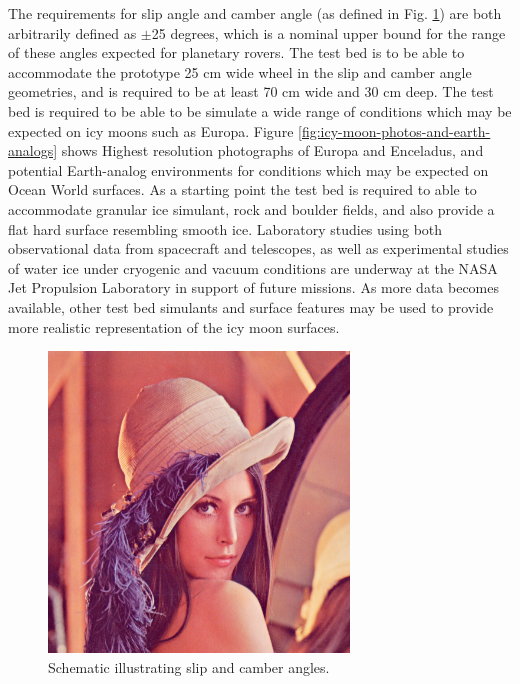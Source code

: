 \documentclass{article}
\begin{document}
The requirements for slip angle and camber angle (as defined in Fig. \ref{fig:slip-camber-schmatic}) are both arbitrarily defined as $\pm$25 degrees, which is a nominal upper bound for the range of these angles expected for planetary rovers. The test bed is to be able to accommodate the prototype 25 cm wide wheel in the slip and camber angle geometries, and is required to be at least 70 cm wide and 30 cm deep. The test bed is required to be able to be simulate a wide range of conditions which may be expected on icy moons such as Europa. Figure \ref{fig:icy-moon-photos-and-earth-analogs} shows Highest resolution photographs of Europa and Enceladus, and potential Earth-analog environments for conditions which may be expected on Ocean World surfaces. As a starting point the test bed is required to able to accommodate granular ice simulant, rock and boulder fields, and also provide a flat hard surface resembling smooth ice. Laboratory studies using both observational data from spacecraft and telescopes, as well as experimental studies of water ice under cryogenic and  vacuum conditions are underway at the NASA Jet Propulsion Laboratory in support of future missions. As more data becomes available, other test bed simulants and surface features may be used to provide more realistic representation of the icy moon surfaces. 

\begin{figure}[hbt!]
\centering
\includegraphics[width=3.15in]{general-images/Lenna.png}
\caption{Schematic illustrating slip and camber angles.}
\label{fig:slip-camber-schmatic}
\end{figure}
\end{document}
